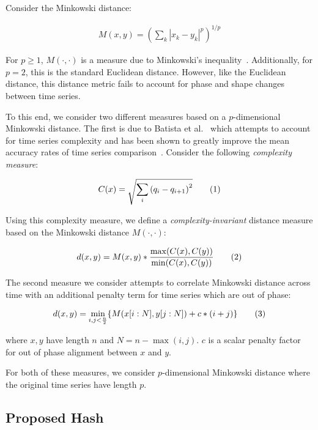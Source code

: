 \documentclass[a4paper]{article}
\newcommand\numberthis{\addtocounter{equation}{1}\tag{\theequation}}
\theoremstyle{def}
\theoremstyle{thm}
\begin{document}
Consider the Minkowski distance:

\begin{align}
    M(x,y) = {(\sum\limits_k |x_k - y_k|^p)}^{1/p}
\end{align}

For $p \ge 1$, $M(\cdot,\cdot)$ is a measure due to Minkowski's inequality~\cite[p. 190]{wheeden15-measure}.
Additionally, for $p = 2$, this is the standard Euclidean distance.
However, like the Euclidean distance, this distance metric fails to account for phase and shape changes between time series.

To this end, we consider two different measures based on a $p$-dimensional Minkowski distance.
The first is due to Batista et al.~\cite{batista14-cid} which attempts to account for time series complexity and has been shown to greatly improve the mean accuracy rates of time series comparison~\cite{giusti13-ecd}.
Consider the following \textit{complexity measure}:

\begin{align*}
    C(x) = \sqrt{\sum\limits_i {(q_i - q_{i+1})}^2} \numberthis
\end{align*}

Using this complexity measure, we define a \textit{complexity-invariant} distance measure based on the Minkowski distance $M(\cdot,\cdot)$:

\begin{align*}
    d(x,y) = M(x,y) * \frac{\max(C(x),C(y))}{\min(C(x),C(y))} \numberthis
\end{align*}

The second measure we consider attempts to correlate Minkowski distance across time with an additional penalty term for time series which are out of phase:

\begin{align*}
    d(x,y) = \min\limits_{i,j<\frac{n}{2}} \{ M(x[i:N],y[j:N]) + c*(i+j) \} \numberthis \\
\end{align*}

where $x,y$ have length $n$ and $N = n - \max(i,j)$.
$c$ is a scalar penalty factor for out of phase alignment between $x$ and $y$.

For both of these measures, we consider $p$-dimensional Minkowski distance where the original time series have length $p$.

\subsection{Proposed Hash}
\end{document}
